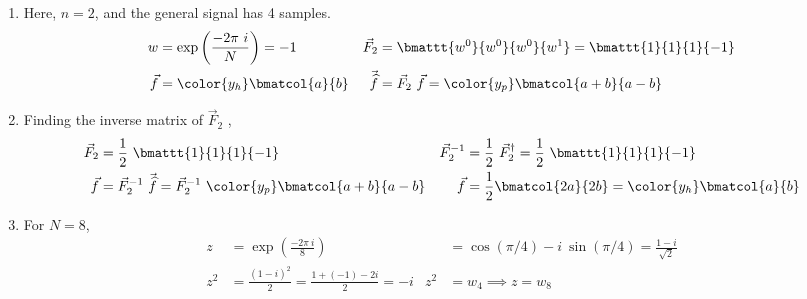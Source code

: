 \begin{enumerate}
    \item Here, $ n = 2 $, and the general signal has 4 samples.
          \begin{align}
              w                 & = \exp\left( \frac{-2\pi\ i}{N} \right)= -1 &
              \vec{F}_2         & = \bmattt{w^0}{w^0}{w^0}{w^1}
              = \bmattt{1}{1}{1}{-1}                                            \\
              \vec{f}           & = \color{y_h} \bmatcol{a}{b}                &
              \vec{\widehat{f}} & = \vec{F}_2\ \vec{f} =
              \color{y_p} \bmatcol{a+b}{a-b}
          \end{align}

    \item Finding the inverse matrix of $ \vec{F}_2 $ ,
          \begin{align}
              \vec{F}_2                       & = \frac{1}{2}\ \bmattt{1}{1}{1}{-1} &
              \vec{F}_2^{-1}                  & = \frac{1}{2}\ \vec{F}_2^\dag
              = \frac{1}{2}\ \bmattt{1}{1}{1}{-1}                                     \\
              \vec{f}                         &
              = \vec{F}_2^{-1}\ \vec{\widehat{f}}
              = \vec{F}_2^{-1}
              \ \color{y_p}\bmatcol{a+b}{a-b} &
              \vec{f}                         & = \frac{1}{2}
              \bmatcol{2a}{2b} = \color{y_h}\bmatcol{a}{b}
          \end{align}

    \item For $ N = 8 $,
          \begin{align}
              z   & = \exp\left( \frac{-2\pi\ i}{8} \right)                 &
                  & = \cos(\pi/4) - i\ \sin(\pi/4) = \frac{1 - i}{\sqrt{2}}   \\
              z^2 & = \frac{(1-i)^2}{2} = \frac{1 + (-1) - 2i}{2} = -i      &
              z^2 & = w_4 \implies z = w_8
          \end{align}


\end{enumerate}
